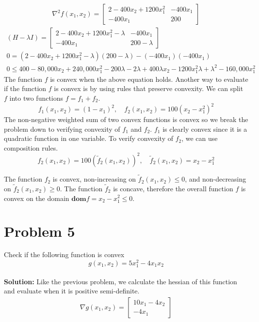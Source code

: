 \documentclass[11pt]{article}
\begin{document}
\begin{align*}
  \nabla^2 f (x_1, x_2) =
  \begin{bmatrix}
    2 - 400x_2 + 1200 x_1^2 & -400 x_1 \\
    -400x_1 & 200
  \end{bmatrix}
\end{align*}
\begin{align*}
  (H- \lambda I) =
  \begin{bmatrix}
    2 - 400x_2 + 1200 x_1^2 - \lambda & -400 x_1 \\
    -400x_1 & 200 - \lambda
  \end{bmatrix}
  \\
  0 = (2 - 400x_2 + 1200 x_1^2 - \lambda)(200 - \lambda) - (-400 x_1) (-400 x_1) \\
  0 \leq 400 - 80,000 x_2 + 240,000 x_1^2 - 200 \lambda - 2 \lambda + 400 \lambda x_2 - 1200 x_1^2 \lambda + \lambda^2 - 160,000 x_1 ^2
\end{align*}
The function $f$ is convex when the above equation holds.
Another way to evaluate if the function $f$ is convex is by using rules that preserve convexity.
We can split $f$ into two functions $f = f_1 + f_2$.
\begin{equation*}
  f_1(x_1, x_2) = (1-x_1)^2, \quad f_2(x_1, x_2) = 100(x_2 - x_1^2)^2
\end{equation*}  
The non-negative weighted sum of two convex functions is convex so we break the problem down to verifying convexity of $f_1$ and $f_2$.
$f_1$ is clearly convex since it is a quadratic function in one variable.
To verify convexity of $f_2$, we can use composition rules.
\begin{equation*}
  f_2(x_1, x_2) = 100(\tilde{f}_2(x_1, x_2))^2, \quad \tilde{f}_2(x_1, x_2) = x_2 - x_1^2
\end{equation*}


The function $f_2$ is convex, non-increasing on $\tilde{f}_2(x_1, x_2) \leq 0$, and non-decreasing on $\tilde{f}_2(x_1, x_2) \geq 0$.
The function $\tilde{f}_2$ is concave, therefore the overall function $f$ is convex on the domain $\textbf{dom} f = x_2 - x_1^2 \leq 0$.


\section{Problem 5}
Check if the following function is convex
\begin{equation*}
  g(x_1, x_2) = 5 x_1^2 - 4x_1 x_2
\end{equation*}
\\
\textbf{Solution: }
Like the previous problem, we calculate the hessian of this function and evaluate when it is positive semi-definite.
\begin{align*}
  \nabla g(x_1, x_2) = 
  \begin{bmatrix}
    10 x_1 - 4 x_2 \\
    -4 x_1
  \end{bmatrix}
\end{align*}
\end{document}
